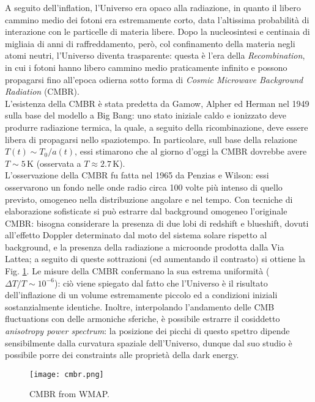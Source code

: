 A seguito dell'inflation, l'Universo era opaco alla radiazione, in quanto il libero cammino medio dei fotoni era estremamente corto, data l'altissima probabilità di interazione con le particelle di materia libere. Dopo la nucleosintesi e centinaia di migliaia di anni di raffreddamento, però, col confinamento della materia negli atomi neutri, l'Universo diventa trasparente: questa è l'era della \textit{Recombination}, in cui i fotoni hanno libero cammino medio praticamente infinito e possono propagarsi fino all'epoca odierna sotto forma di \textit{Cosmic Microwave Background Radiation} (CMBR).\\
L'esistenza della CMBR è stata predetta da Gamow, Alpher ed Herman nel 1949 sulla base del modello a Big Bang: uno stato iniziale caldo e ionizzato deve produrre radiazione termica, la quale, a seguito della ricombinazione, deve essere libera di propagarsi nello spaziotempo. In particolare, sull base della relazione $ T(t) \sim T_0 / a(t) $, essi stimarono che al giorno d'oggi la CMBR dovrebbe avere $ T \sim 5 \,\text{K} $ (osservata a $ T \approx 2.7 \,\text{K} $).\\
L'osservazione della CMBR fu fatta nel 1965 da Penzias e Wilson: essi osservarono un fondo nelle onde radio circa 100 volte più intenso di quello previsto, omogeneo nella distribuzione angolare e nel tempo. Con tecniche di elaborazione sofisticate si può estrarre dal background omogeneo l'originale CMBR: bisogna considerare la presenza di due lobi di redshift e blueshift, dovuti all'effetto Doppler determinato dal moto del sistema solare rispetto al background, e la presenza della radiazione a microonde prodotta dalla Via Lattea; a seguito di queste sottrazioni (ed aumentando il contrasto) si ottiene la Fig. \ref{cmbr}.
Le misure della CMBR confermano la sua estrema uniformità ($ \Delta T / T \sim 10^{-6} $): ciò viene spiegato dal fatto che l'Universo è il risultato dell'inflazione di un volume estremamente piccolo ed a condizioni iniziali sostanzialmente identiche. Inoltre, interpolando l'andamento delle CMB fluctuations con delle armoniche sferiche, è possibile estrarre il cosiddetto \textit{anisotropy power spectrum}: la posizione dei picchi di questo spettro dipende sensibilmente dalla curvatura spaziale dell'Universo, dunque dal suo studio è possibile porre dei constraints alle proprietà della dark energy.

\begin{figure}
	\centering
	\texttt{[image: cmbr.png]}
	\caption{CMBR from WMAP.}
	\label{cmbr}
\end{figure}










